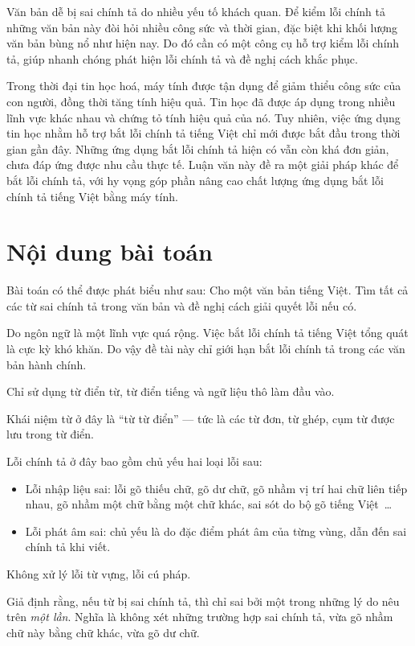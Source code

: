 \documentclass[a4paper,oneside,14pt]{extbook} %
\begin{document}
Văn bản dễ bị sai chính tả do nhiều yếu tố khách quan. Để kiểm lỗi
chính tả những văn bản này đòi hỏi nhiều công sức và thời gian, đặc
biệt khi khối lượng văn bản bùng nổ như hiện nay. Do đó cần có một
công cụ hỗ trợ kiểm lỗi chính tả, giúp nhanh chóng phát hiện lỗi chính
tả và đề nghị cách khắc phục.

Trong thời đại tin học hoá, máy tính được tận dụng để giảm thiểu công
sức của con người, đồng thời tăng tính hiệu quả. Tin học đã được áp
dụng trong nhiều lĩnh vực khác nhau và chứng tỏ tính hiệu quả của
nó. Tuy nhiên, việc ứng dụng tin học nhằm hỗ trợ bắt lỗi
chính tả tiếng Việt chỉ mới được bắt đầu trong thời gian gần
đây. Những ứng dụng bắt lỗi chính tả hiện có vẫn còn khá đơn
giản, chưa đáp ứng được nhu cầu thực tế. Luận văn này đề ra một giải
pháp khác để bắt lỗi chính tả, với hy vọng góp phần nâng cao chất
lượng ứng dụng bắt lỗi chính tả tiếng Việt bằng máy tính.

\section{Nội dung bài toán}

Bài toán có thể được phát biểu như sau:
Cho một văn bản tiếng Việt. Tìm tất cả các từ sai chính tả trong văn bản
và đề nghị cách giải quyết lỗi nếu có.


Do ngôn ngữ là một lĩnh vực quá rộng. Việc bắt lỗi chính tả tiếng Việt
tổng quát là cực kỳ khó khăn. Do vậy đề tài này chỉ giới hạn bắt lỗi
chính tả trong các văn bản hành chính.

Chỉ sử dụng từ điển từ, từ điển tiếng và ngữ liệu thô làm đầu vào.

Khái niệm từ ở đây là ``từ từ điển'' --- tức là các từ đơn, từ ghép,
cụm từ được lưu trong từ điển. 

Lỗi chính tả ở đây bao gồm chủ yếu hai loại lỗi sau:
\begin{itemize}
\item Lỗi nhập liệu sai: lỗi gõ thiếu chữ, gõ dư chữ, gõ nhầm vị trí
  hai chữ liên tiếp nhau, gõ nhầm một chữ bằng một chữ khác, sai sót
  do bộ gõ tiếng Việt~\ldots{}
\item Lỗi phát âm sai: chủ yếu là do đặc điểm phát âm của từng vùng,
  dẫn đến sai chính tả khi viết.
\end{itemize}

Không xử lý lỗi từ vựng, lỗi cú pháp.

Giả định rằng, nếu từ bị sai chính tả, thì chỉ sai bởi một trong những
lý do nêu trên {\em một lần}. Nghĩa là không xét những trường hợp sai
chính tả, vừa gõ nhầm chữ này bằng chữ khác, vừa gõ dư chữ.
\end{document}
